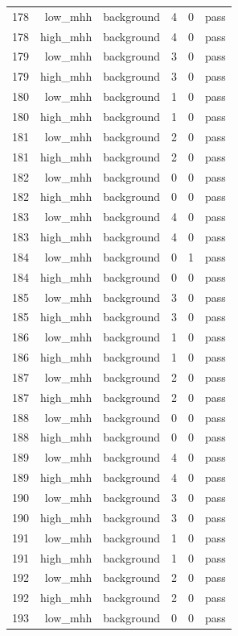 \begin{table}[htbp]
{\begin{tabular}{lrrrrr}
178 & low\_mhh & background & 4 & 0 & pass \\
178 & high\_mhh & background & 4 & 0 & pass \\
179 & low\_mhh & background & 3 & 0 & pass \\
179 & high\_mhh & background & 3 & 0 & pass \\
180 & low\_mhh & background & 1 & 0 & pass \\
180 & high\_mhh & background & 1 & 0 & pass \\
181 & low\_mhh & background & 2 & 0 & pass \\
181 & high\_mhh & background & 2 & 0 & pass \\
182 & low\_mhh & background & 0 & 0 & pass \\
182 & high\_mhh & background & 0 & 0 & pass \\
183 & low\_mhh & background & 4 & 0 & pass \\
183 & high\_mhh & background & 4 & 0 & pass \\
184 & low\_mhh & background & 0 & 1 & pass \\
184 & high\_mhh & background & 0 & 0 & pass \\
185 & low\_mhh & background & 3 & 0 & pass \\
185 & high\_mhh & background & 3 & 0 & pass \\
186 & low\_mhh & background & 1 & 0 & pass \\
186 & high\_mhh & background & 1 & 0 & pass \\
187 & low\_mhh & background & 2 & 0 & pass \\
187 & high\_mhh & background & 2 & 0 & pass \\
188 & low\_mhh & background & 0 & 0 & pass \\
188 & high\_mhh & background & 0 & 0 & pass \\
189 & low\_mhh & background & 4 & 0 & pass \\
189 & high\_mhh & background & 4 & 0 & pass \\
190 & low\_mhh & background & 3 & 0 & pass \\
190 & high\_mhh & background & 3 & 0 & pass \\
191 & low\_mhh & background & 1 & 0 & pass \\
191 & high\_mhh & background & 1 & 0 & pass \\
192 & low\_mhh & background & 2 & 0 & pass \\
192 & high\_mhh & background & 2 & 0 & pass \\
193 & low\_mhh & background & 0 & 0 & pass \\

\end{tabular}}
\end{table}
